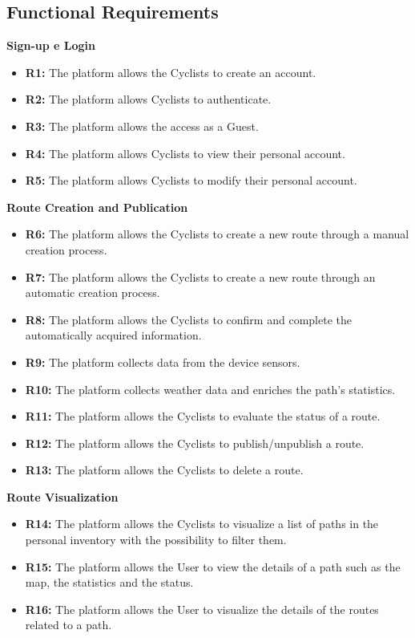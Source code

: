 \subsection{Functional Requirements}
\textbf{Sign-up e Login}
\begin{itemize}
    \item \textbf{R1:} The platform allows the Cyclists to create an account.
    \item \textbf{R2:} The platform allows Cyclists to authenticate.
    \item \textbf{R3:} The platform allows the access as a Guest. 
    \item \textbf{R4:} The platform allows Cyclists to view their personal account.
    \item \textbf{R5:} The platform allows Cyclists to modify their personal account.
\end{itemize}
\textbf{Route Creation and Publication}
\begin{itemize}
    \item \textbf{R6:} The platform allows the Cyclists to create a new route through a manual creation process.
    \item \textbf{R7:} The platform allows the Cyclists to create a new route through an automatic creation process.
    \item \textbf{R8:} The platform allows the Cyclists to confirm and complete the automatically acquired information.
    \item \textbf{R9:} The platform collects data from the device sensors.
    \item \textbf{R10:} The platform collects weather data and enriches the path's statistics.
    \item \textbf{R11:} The platform allows the Cyclists to evaluate the status of a route. 
    \item \textbf{R12:} The platform allows the Cyclists to publish/unpublish a route.
    \item \textbf{R13:} The platform allows the Cyclists to delete a route.
\end{itemize}
\textbf{Route Visualization}
\begin{itemize}
    \item \textbf{R14:} The platform allows the Cyclists to visualize a list of paths in the personal inventory with the possibility to filter them.
    \item \textbf{R15:} The platform allows the User to view the details of a path such as the map, the statistics and the status.
    \item \textbf{R16:} The platform allows the User to visualize the details of the routes related to a path.
\end{itemize}
